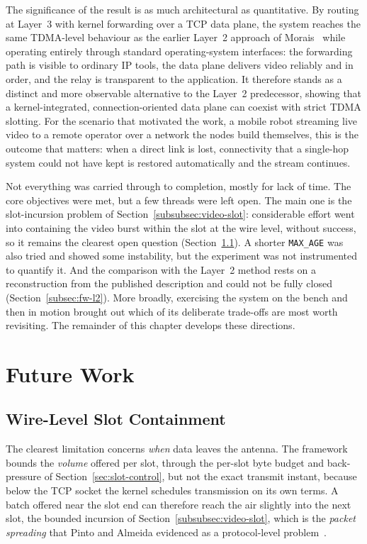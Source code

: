 The significance of the result is as much architectural as quantitative. By
routing at Layer~3 with kernel forwarding over a TCP data plane, the system
reaches the same TDMA-level behaviour as the earlier Layer~2 approach of
Morais~\cite{morais2024synchronization} while operating entirely through standard
operating-system interfaces: the forwarding path is visible to ordinary IP tools,
the data plane delivers video reliably and in order, and the relay is transparent
to the application. It therefore stands as a distinct and more observable
alternative to the Layer~2 predecessor, showing that a kernel-integrated,
connection-oriented data plane can coexist with strict TDMA slotting. For the
scenario that motivated the work, a mobile robot streaming live video to a remote
operator over a network the nodes build themselves, this is the outcome that
matters: when a direct link is lost, connectivity that a single-hop system could
not have kept is restored automatically and the stream continues.

Not everything was carried through to completion, mostly for lack of time. The
core objectives were met, but a few threads were left open. The main one is the
slot-incursion problem of Section~\ref{subsubsec:video-slot}: considerable effort
went into containing the video burst within the slot at the wire level, without
success, so it remains the clearest open question
(Section~\ref{subsec:fw-slot-containment}). A shorter \texttt{MAX\_AGE} was also
tried and showed some instability, but the experiment was not instrumented to
quantify it. And the comparison with the Layer~2 method rests on a reconstruction
from the published description and could not be fully closed
(Section~\ref{subsec:fw-l2}). More broadly, exercising the system on the bench and
then in motion brought out which of its deliberate trade-offs are most worth
revisiting. The remainder of this chapter develops these directions.


\section{Future Work}
\label{sec:future-work}

\subsection{Wire-Level Slot Containment}
\label{subsec:fw-slot-containment}

The clearest limitation concerns \emph{when} data leaves the antenna. The
framework bounds the \emph{volume} offered per slot, through the per-slot byte
budget and back-pressure of Section~\ref{sec:slot-control}, but not the exact
transmit instant, because below the TCP socket the kernel schedules transmission
on its own terms. A batch offered near the slot end can therefore reach the air
slightly into the next slot, the bounded incursion of
Section~\ref{subsubsec:video-slot}, which is the \emph{packet spreading} that
Pinto and Almeida evidenced as a protocol-level
problem~\cite{pinto2018robust, ramos2018aerial}.

